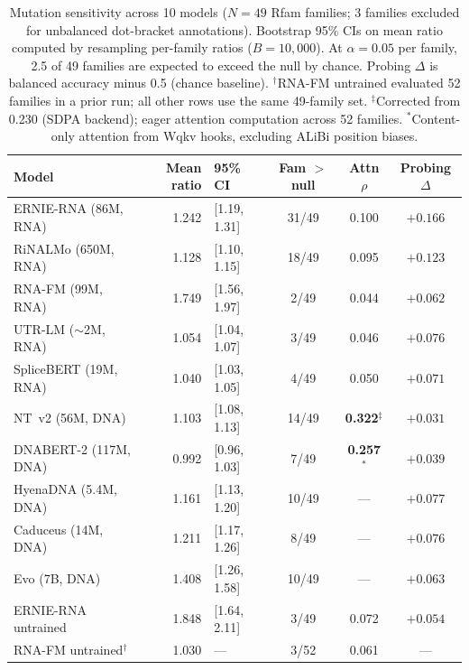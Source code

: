 \documentclass[11pt]{article}
\begin{document}
\begin{table}[htbp]
\centering
\caption{Mutation sensitivity across 10 models ($N = 49$ Rfam families;
3 families excluded for unbalanced dot-bracket annotations).
Bootstrap 95\% CIs on mean ratio computed by resampling per-family
ratios ($B = 10{,}000$). At $\alpha = 0.05$ per family, 2.5 of 49
families are expected to exceed the null by chance.
Probing $\Delta$ is balanced accuracy minus 0.5 (chance baseline).
$^\dagger$RNA-FM untrained evaluated 52 families in a prior run;
all other rows use the same 49-family set.
$^\ddagger$Corrected from 0.230 (SDPA backend); eager attention
computation across 52 families.
$^{*}$Content-only attention from Wqkv hooks, excluding ALiBi
position biases.}
\label{tab:rung1}
\small
\begin{tabular}{lrlccc}
\toprule
\textbf{Model} & \textbf{Mean ratio} & \textbf{95\% CI} & \textbf{Fam $>$ null} & \textbf{Attn $\rho$} & \textbf{Probing $\Delta$} \\
\midrule
ERNIE-RNA (86M, RNA)    & 1.242 & [1.19, 1.31] & 31/49 & 0.100          & $+0.166$ \\
RiNALMo (650M, RNA)     & 1.128 & [1.10, 1.15] & 18/49 & 0.095          & $+0.123$ \\
RNA-FM (99M, RNA)       & 1.749 & [1.56, 1.97] & 2/49  & 0.044          & $+0.062$ \\
UTR-LM ($\sim$2M, RNA)  & 1.054 & [1.04, 1.07] & 3/49  & 0.046          & $+0.076$ \\
SpliceBERT (19M, RNA)   & 1.040 & [1.03, 1.05] & 4/49  & 0.050          & $+0.071$ \\
NT~v2 (56M, DNA)        & 1.103 & [1.08, 1.13] & 14/49 & \textbf{0.322}$^\ddagger$ & $+0.031$ \\
DNABERT-2 (117M, DNA)   & 0.992 & [0.96, 1.03] & 7/49  & \textbf{0.257}$^{*}$ & $+0.039$ \\
HyenaDNA (5.4M, DNA)    & 1.161 & [1.13, 1.20] & 10/49 & ---            & $+0.077$ \\
Caduceus (14M, DNA)     & 1.211 & [1.17, 1.26] & 8/49  & ---            & $+0.076$ \\
Evo (7B, DNA)           & 1.408 & [1.26, 1.58] & 10/49 & ---            & $+0.063$ \\
\midrule
ERNIE-RNA untrained     & 1.848 & [1.64, 2.11] & 3/49  & 0.072          & $+0.054$ \\
RNA-FM untrained$^\dagger$ & 1.030 & ---        & 3/52  & 0.061          & --- \\
\bottomrule
\end{tabular}
\end{table}
\end{document}
